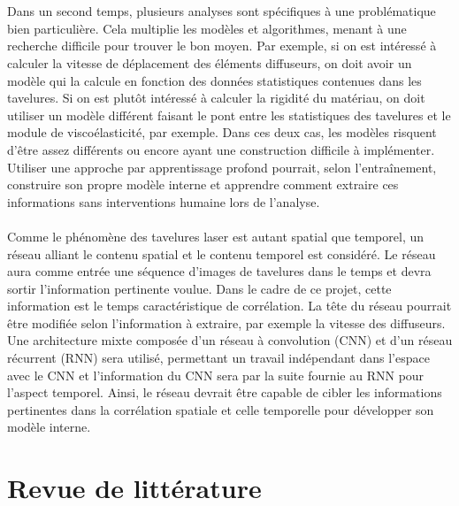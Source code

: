 \documentclass[MSc,french]{ulthese}
\begin{document}
\\ \\
Dans un second temps, plusieurs analyses sont spécifiques à une problématique bien particulière. Cela multiplie les modèles et algorithmes, menant à une recherche difficile pour trouver le bon moyen. Par exemple, si on est intéressé à calculer la vitesse de déplacement des éléments diffuseurs, on doit avoir un modèle qui la calcule en fonction des données statistiques contenues dans les tavelures. Si on est plutôt intéressé à calculer la rigidité du matériau, on doit utiliser un modèle différent faisant le pont entre les statistiques des tavelures et le module de viscoélasticité, par exemple. Dans ces deux cas, les modèles risquent d'être assez différents ou encore ayant une construction difficile à implémenter. Utiliser une approche par apprentissage profond pourrait, selon l'entraînement, construire son propre modèle interne et apprendre comment extraire ces informations sans interventions humaine lors de l'analyse.
\\ \\
Comme le phénomène des tavelures laser est autant spatial que temporel, un réseau alliant le contenu spatial et le contenu temporel est considéré. Le réseau aura comme entrée une séquence d'images de tavelures dans le temps et devra sortir l'information pertinente voulue. Dans le cadre de ce projet, cette information est le temps caractéristique de corrélation. La tête du réseau pourrait être modifiée selon l'information à extraire, par exemple la vitesse des diffuseurs. Une architecture mixte composée d'un réseau à convolution (CNN) et d'un réseau récurrent (RNN) sera utilisé, permettant un travail indépendant dans l'espace avec le CNN et l'information du CNN sera par la suite fournie au RNN pour l'aspect temporel. Ainsi, le réseau devrait être capable de cibler les informations pertinentes dans la corrélation spatiale et celle temporelle pour développer son modèle interne.
\newpage
\chapter{Revue de littérature}
\end{document}
